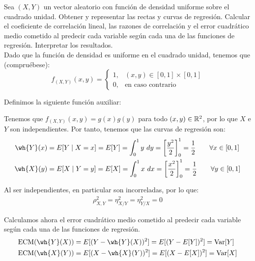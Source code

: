 \begin{ejercicio}
    Sea $(X,Y)$ un vector aleatorio con función de densidad uniforme sobre el cuadrado unidad. Obtener y representar las rectas y curvas de regresión. Calcular el coeficiente de correlación lineal, las razones de correlación y el error cuadrático medio cometido al predecir cada variable según cada una de las funciones de regresión. Interpretar los resultados.\\

    Dado que la función de densidad es uniforme en el cuadrado unidad, tenemos que (compruébese):
    \begin{equation*}
        f_{(X,Y)}(x, y) = \begin{cases}
            1, & (x, y) \in [0,1]\times [0,1]\\
            0, & \text{en caso contrario}
        \end{cases}
    \end{equation*}

    Definimos la siguiente función auxiliar:

    Tenemos que $f_{(X,Y)}(x, y) = g(x)g(y)$ para todo $(x, y)\in\mathbb{R}^2$, por lo que $X$ e $Y$ son independientes. Por tanto, tenemos que las curvas de regresión son:
    \begin{align*}
        \wh{Y}(x) &= E[Y\mid X=x] = E[Y] = \int_{0}^{1} y \ dy = \left[\dfrac{y^2}{2}\right]_{0}^{1} = \dfrac{1}{2} \qquad \forall x\in[0,1]\\
        \wh{X}(y) &= E[X\mid Y=y] = E[X] = \int_{0}^{1} x \ dx = \left[\dfrac{x^2}{2}\right]_{0}^{1} = \dfrac{1}{2} \qquad \forall y\in[0,1]
    \end{align*}

    Al ser independientes, en particular son incorreladas, por lo que:
    \begin{align*}
        \rho^2_{X,Y} = \eta^2_{X/Y} = \eta^2_{Y/X} = 0
    \end{align*}

    Calculamos ahora el error cuadrático medio cometido al predecir cada variable según cada una de las funciones de regresión.
    \begin{align*}
        \text{ECM}(\wh{Y}(X)) &= E[(Y-\wh{Y}(X))^2] = E[(Y-E[Y])^2] = \Var[Y] \\
        \text{ECM}(\wh{X}(Y)) &= E[(X-\wh{X}(Y))^2] = E[(X-E[X])^2] = \Var[X]
    \end{align*}


\end{ejercicio}

